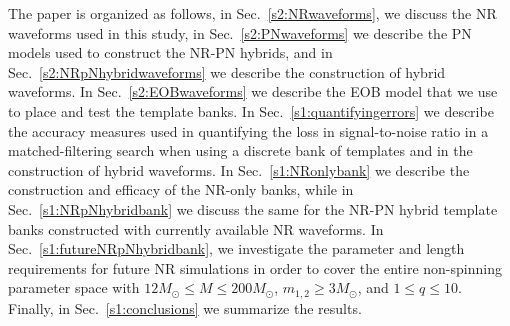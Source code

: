 The paper is organized as follows, in Sec.~\ref{s2:NRwaveforms}, we discuss
the NR waveforms used in this study, in Sec.~\ref{s2:PNwaveforms} we
describe the PN models used to construct the NR-PN hybrids,  and in Sec.~\ref{s2:NRpNhybridwaveforms} we describe the
construction of hybrid waveforms. In Sec.~\ref{s2:EOBwaveforms} we 
describe the EOB model that we use to place and test the template
banks. In Sec.~\ref{s1:quantifyingerrors} we describe the accuracy
measures used in quantifying the loss in signal-to-noise ratio in a
matched-filtering search when using a discrete bank of templates and
in the construction of hybrid waveforms. In Sec.~\ref{s1:NRonlybank}
we describe the construction and efficacy of the NR-only banks, while in
Sec.~\ref{s1:NRpNhybridbank} we discuss the same for the NR-PN hybrid 
template banks constructed with currently available NR waveforms. In
Sec.~\ref{s1:futureNRpNhybridbank}, we investigate the parameter and length
requirements for future NR simulations in order to cover the entire 
non-spinning parameter space with $12 M_\odot\leq M\leq 200M_\odot$, 
$m_{1,2} \geq 3M_\odot$, and $1 \leq q \leq 10$. Finally, in 
Sec.~\ref{s1:conclusions} we summarize the results. 
